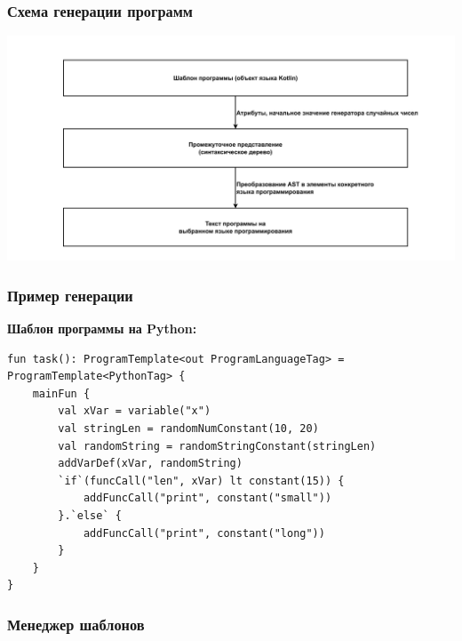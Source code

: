 \documentclass[14pt,aspectratio=169,hyperref={pdftex,unicode},xcolor=dvipsnames]{beamer}
\begin{document}
\begin{frame}
    \frametitle{Схема генерации программ}
    \begin{center}
        \includegraphics[width=\textwidth]{images/generation-steps.pdf}
    \end{center}
\end{frame}

\begin{frame}[fragile]
    \frametitle{Пример генерации}
    \textbf{Шаблон программы на Python:}\\
    \begin{verbatim}
fun task(): ProgramTemplate<out ProgramLanguageTag> = ProgramTemplate<PythonTag> {
    mainFun {
        val xVar = variable("x")
        val stringLen = randomNumConstant(10, 20)
        val randomString = randomStringConstant(stringLen)
        addVarDef(xVar, randomString)
        `if`(funcCall("len", xVar) lt constant(15)) {
            addFuncCall("print", constant("small"))
        }.`else` {
            addFuncCall("print", constant("long"))
        }
    }
}
\end{verbatim}
\end{frame}
\begin{frame}
    \frametitle{Менеджер шаблонов}
\end{frame}
\end{document}
